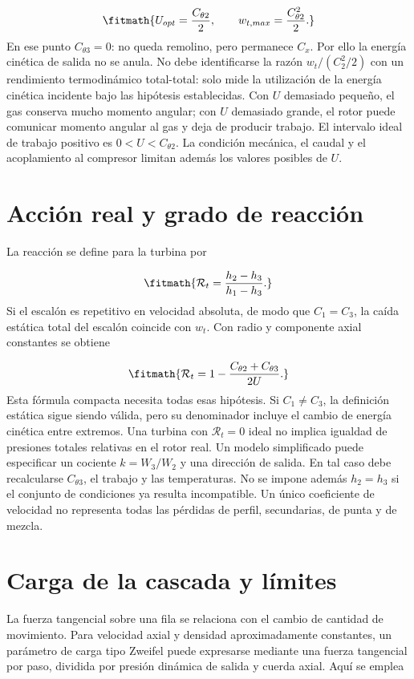 \documentclass[10pt,openany]{book}
\begin{document}
\[
\fitmath{U_{opt}=\frac{C_{\theta2}}{2},\qquad
w_{t,max}=\frac{C_{\theta2}^2}{2}.}
\]
En ese punto \(C_{\theta3}=0\): no queda remolino, pero permanece \(C_x\). Por ello la energía cinética de salida no se anula. No debe identificarse la razón \(w_t/(C_2^2/2)\) con un rendimiento termodinámico total-total: solo mide la utilización de la energía cinética incidente bajo las hipótesis establecidas.
Con \(U\) demasiado pequeño, el gas conserva mucho momento angular; con \(U\) demasiado grande, el rotor puede comunicar momento angular al gas y deja de producir trabajo. El intervalo ideal de trabajo positivo es \(0<U<C_{\theta2}\). La condición mecánica, el caudal y el acoplamiento al compresor limitan además los valores posibles de \(U\).

\section{Acción real y grado de reacción}


La reacción se define para la turbina por



\[
\fitmath{\mathcal R_t=\frac{h_2-h_3}{h_1-h_3}.}
\]
Si el escalón es repetitivo en velocidad absoluta, de modo que \(C_1=C_3\), la caída estática total del escalón coincide con \(w_t\). Con radio y componente axial constantes se obtiene

\[
\fitmath{\mathcal R_t=1-\frac{C_{\theta2}+C_{\theta3}}{2U}.}
\]
Esta fórmula compacta necesita todas esas hipótesis. Si \(C_1\ne C_3\), la definición estática sigue siendo válida, pero su denominador incluye el cambio de energía cinética entre extremos. Una turbina con \(\mathcal R_t=0\) ideal no implica igualdad de presiones totales relativas en el rotor real.
Un modelo simplificado puede especificar un cociente \(k=W_3/W_2\) y una dirección de salida. En tal caso debe recalcularse \(C_{\theta3}\), el trabajo y las temperaturas. No se impone además \(h_2=h_3\) si el conjunto de condiciones ya resulta incompatible. Un único coeficiente de velocidad no representa todas las pérdidas de perfil, secundarias, de punta y de mezcla.

\section{Carga de la cascada y límites}

La fuerza tangencial sobre una fila se relaciona con el cambio de cantidad de movimiento. Para velocidad axial y densidad aproximadamente constantes, un parámetro de carga tipo Zweifel puede expresarse mediante una fuerza tangencial por paso, dividida por presión dinámica de salida y cuerda axial. Aquí se emplea
\end{document}
